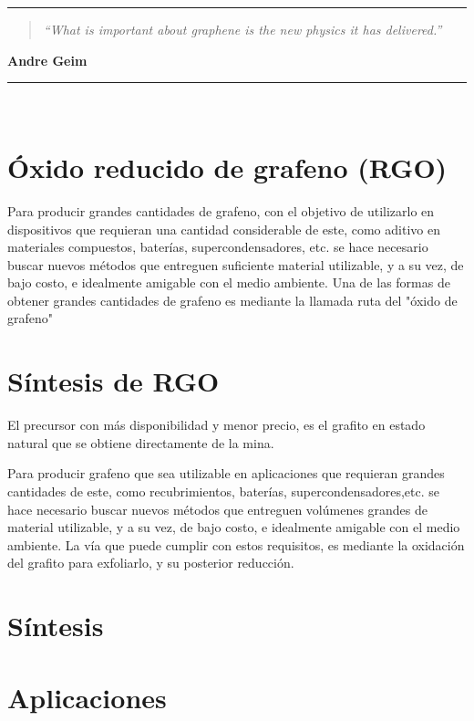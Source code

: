 \noindent
\rule{\linewidth}{1 pt}
\begin{flushright}
	\begin{quotation}
		\small{
			\textit{``What is important about graphene is the new physics it has delivered.''}}
	\end{quotation}
	\bf{Andre Geim}
\end{flushright}
\noindent
\rule{\linewidth}{1 pt}\\
\vfill

\section{Óxido reducido de grafeno (RGO)}
Para producir grandes cantidades de grafeno, con el objetivo de utilizarlo en dispositivos que requieran una cantidad considerable de este, como aditivo en materiales compuestos, baterías, supercondensadores, etc. se hace necesario buscar nuevos métodos que entreguen suficiente material utilizable, y a su vez, de bajo costo, e idealmente amigable con el medio ambiente.
Una de las formas de obtener grandes cantidades de grafeno es mediante la llamada ruta del "óxido de grafeno"
\section{Síntesis de RGO}
El precursor con más disponibilidad y menor precio, es el grafito en estado natural que se obtiene directamente de la mina.

Para producir grafeno que sea utilizable en aplicaciones que requieran grandes cantidades de este, como recubrimientos, baterías, supercondensadores,etc. se hace necesario buscar nuevos métodos que entreguen volúmenes grandes de material utilizable, y a su vez, de bajo costo, e idealmente amigable con el medio ambiente. La vía que puede cumplir con estos requisitos, es mediante la oxidación del grafito para exfoliarlo, y su posterior reducción.

\section{Síntesis}


\section{Aplicaciones}